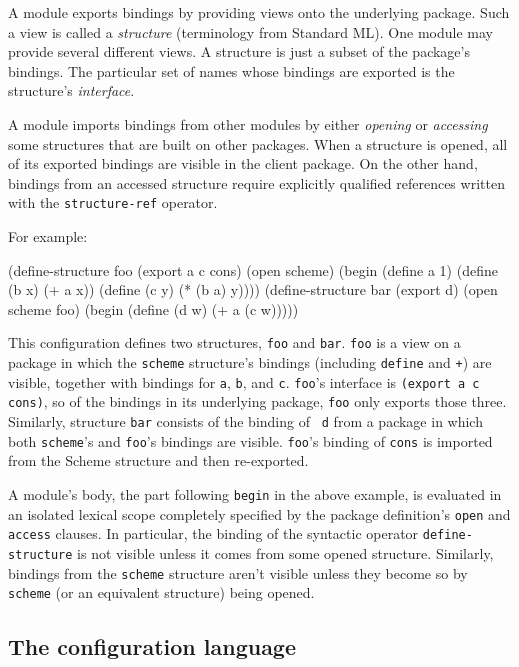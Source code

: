 A module exports bindings by providing views onto the underlying
package.  Such a view is called a {\em structure} (terminology from
Standard ML).  One module may provide several different views.  A
structure is just a subset of the package's bindings.  The particular
set of names whose bindings are exported is the structure's {\em
interface}.

A module imports bindings from other modules by either {\em opening}
or {\em accessing} some structures that are built on other packages.
When a structure is opened, all of its exported bindings are visible
in the client package.  On the other hand, bindings from an accessed
structure require explicitly qualified references written with the
{\tt structure-ref} operator.

For example:
\begin{code}
    (define-structure foo (export a c cons)
      (open scheme)
      (begin (define a 1)
	     (define (b x) (+ a x))
	     (define (c y) (* (b a) y))))
\codeskip
    (define-structure bar (export d)
      (open scheme foo)
      (begin (define (d w) (+ a (c w)))))
\end{code}
This configuration defines two structures, {\tt foo} and {\tt bar}.
{\tt foo} is a view on a package in which the {\tt scheme} structure's
bindings (including {\tt define} and {\tt +}) are visible, together
with bindings for {\tt a}, {\tt b},
and {\tt c}.  {\tt foo}'s interface is {\tt (export a c cons)}, so of
the bindings in its underlying package, {\tt foo} only exports those
three.  Similarly, structure {\tt bar} consists of the binding of {\tt
d} from a package in which both {\tt scheme}'s and {\tt foo}'s
bindings are visible.  {\tt foo}'s binding of {\tt cons} is imported
from the Scheme structure and then re-exported.

A module's body, the part following {\tt begin} in the above example,
is evaluated in an isolated lexical scope completely specified by the
package definition's {\tt open} and {\tt access} clauses.  In
particular, the binding of the syntactic operator {\tt define-structure}
is not visible unless it comes from some opened structure.  Similarly,
bindings from the {\tt scheme} structure aren't visible unless they
become so by {\tt scheme} (or an equivalent structure) being opened.


\subsection*{The configuration language}


